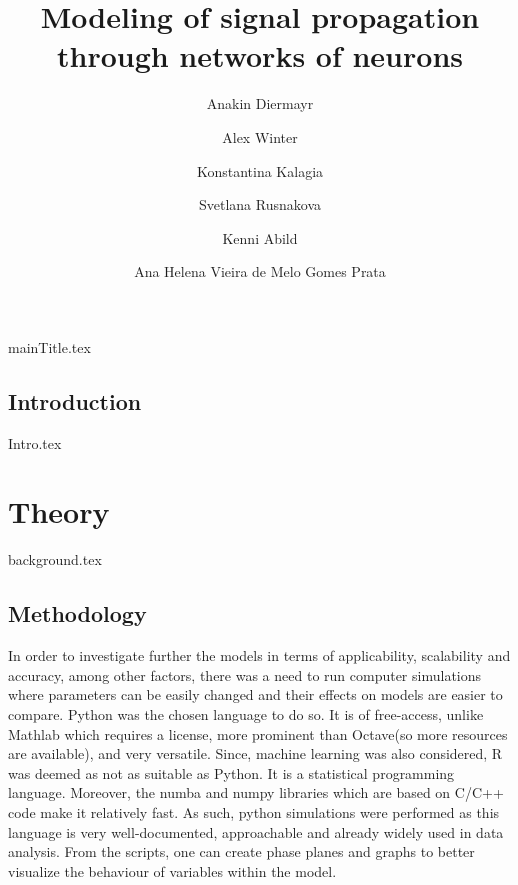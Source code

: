 \documentclass[printGloss]{_NoTouch/myProject}
\title{Modeling of signal propagation through networks of neurons}
\author{ Anakin Diermayr \and  Alex Winter \and Konstantina Kalagia \and Svetlana Rusnakova \and Kenni Abild \and  Ana Helena Vieira de Melo Gomes Prata }
\begin{document}

{mainTitle.tex}
\tableofcontents

\printacronyms%










\newpage
{}
\chapter*{Introduction} 
{Intro.tex}

\part{Theory}

{background.tex}

\newpage
\chapter{Methodology}
 In order to investigate further the models in terms of applicability, scalability and accuracy, among other factors, there was a need to run computer simulations where parameters can be easily changed and their effects on models are easier to compare.
 \newline
 Python was the chosen language to do so. It is of free-access, unlike Mathlab which requires a license, more prominent than Octave(so more resources are available), and very versatile. Since, machine learning was also considered, R was deemed as not as suitable as Python. It is a statistical programming language. Moreover, the numba and numpy libraries which are based on C/C++ code make it relatively fast.\newline
 As such, python simulations were performed as this language is very well-documented, approachable and already widely used in data analysis. From the scripts, one can create phase planes and graphs to better visualize the behaviour of variables within the model.
\end{document}
